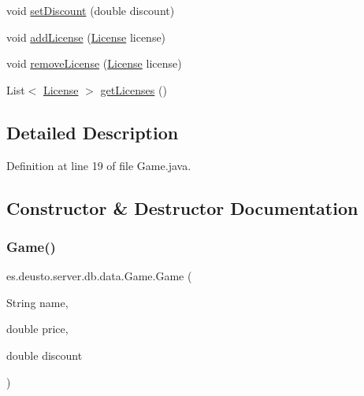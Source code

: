 \begin{DoxyCompactItemize}
void \hyperlink{classes_1_1deusto_1_1server_1_1db_1_1data_1_1_game_a01bf7ea450f005d8d47701e7091c6931}{set\+Discount} (double discount)
\item 
void \hyperlink{classes_1_1deusto_1_1server_1_1db_1_1data_1_1_game_aaa7e3ebbc4cd3b62080b39c98d374424}{add\+License} (\hyperlink{classes_1_1deusto_1_1server_1_1db_1_1data_1_1_license}{License} license)
\item 
void \hyperlink{classes_1_1deusto_1_1server_1_1db_1_1data_1_1_game_a4ca6c0283ef51e95fbed8f52fd76d985}{remove\+License} (\hyperlink{classes_1_1deusto_1_1server_1_1db_1_1data_1_1_license}{License} license)
\item 
List$<$ \hyperlink{classes_1_1deusto_1_1server_1_1db_1_1data_1_1_license}{License} $>$ \hyperlink{classes_1_1deusto_1_1server_1_1db_1_1data_1_1_game_a6da5b38821b5c9bcb71b26721af09bf0}{get\+Licenses} ()
\end{DoxyCompactItemize}


\subsection{Detailed Description}


Definition at line 19 of file Game.\+java.



\subsection{Constructor \& Destructor Documentation}
\mbox{\label{classes_1_1deusto_1_1server_1_1db_1_1data_1_1_game_aad926d06e556453f4b08efa5a3e620d4}} 
\subsubsection{\texorpdfstring{Game()}{Game()}\hspace{0.1cm}{\footnotesize\ttfamily [1/2]}}
{\footnotesize\ttfamily es.\+deusto.\+server.\+db.\+data.\+Game.\+Game (\begin{DoxyParamCaption}\item[{String}]{name,  }\item[{double}]{price,  }\item[{double}]{discount }\end{DoxyParamCaption})}



